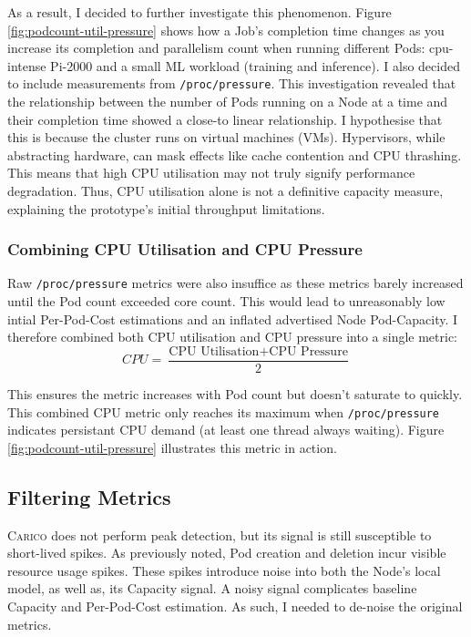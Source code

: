 As a result, I decided to further investigate this phenomenon. Figure
\ref{fig:podcount-util-pressure} shows how a Job's completion time changes as you
increase its completion and parallelism count when running different Pods:
cpu-intense Pi-2000 and a small ML workload (training and inference). I also
decided to include measurements from \verb|/proc/pressure|. This investigation
revealed that the relationship between the number of Pods running on
a Node at a time and their completion time showed a close-to linear
relationship. I hypothesise that this is because the cluster runs on virtual
machines (VMs). Hypervisors, while abstracting hardware, can mask effects like
cache contention and CPU thrashing. This means that high  CPU utilisation may
not truly signify performance degradation. Thus, CPU utilisation alone is not a
definitive capacity measure, explaining the prototype's initial throughput
limitations.

\subsubsection{Combining CPU Utilisation and CPU Pressure}
Raw \verb|/proc/pressure| metrics were also insuffice as these metrics
barely increased until the Pod count exceeded core count. This would lead to
unreasonably low intial Per-Pod-Cost estimations and an inflated advertised Node
Pod-Capacity. I therefore combined both CPU utilisation and CPU pressure
into a single metric:
\[ CPU = \frac{\text{CPU Utilisation} + \text{CPU Pressure}}{2} \]

This ensures the metric increases with Pod count but doesn't saturate to
quickly. This combined CPU metric only reaches its maximum when \verb|/proc/pressure|
indicates persistant CPU demand (at least one thread always waiting). Figure
\ref{fig:podcount-util-pressure} illustrates this metric in action.

\subsection{Filtering Metrics}
\textsc{Carico} does not perform peak detection, but its signal is still
susceptible to short-lived spikes. As previously noted,  Pod creation and
deletion incur visible resource usage spikes. These spikes introduce noise
into both the Node's local model, as well as, its Capacity signal. A noisy
signal complicates baseline Capacity and Per-Pod-Cost estimation. As such, I
needed to de-noise the original metrics.

